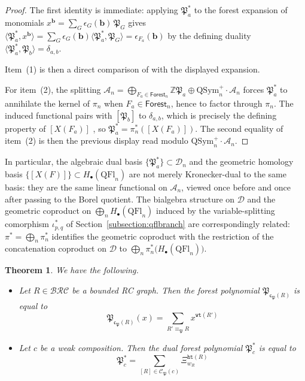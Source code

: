 \documentclass{amsart}
\newtheorem{theorem}{Theorem}[section]
\theoremstyle{definition}
\theoremstyle{remark}
\numberwithin{equation}{subsection}
\newcommand{\wof}[1]{w_{#1}}
\newcommand{\wtt}{\mathtt{wt}}
\newcommand{\hr}{\mathtt{ht}}
\newcommand{\BRC}{\mathcal{BRC}}
\newcommand{\dsch}{\ensuremath{\Xi}}
\newcommand{\coma}{\mathcal{A}}
\newcommand{\dcoma}{\mathcal{D}}
\newcommand{\forest}{\mathfrak{P}}
\newcommand{\fcode}{\mathfrak{c}_\forest}
\begin{document}
\begin{proof}
The first identity is immediate: applying $\forest_a^*$ to the forest expansion of monomials $x^{\mathbf{b}}=\sum_G \epsilon_G(\mathbf{b})\,\forest_G$ \cite[Proposition~10.15]{nadeau2024quasisymmetric} gives $\langle \forest_a^*, x^{\mathbf{b}}\rangle = \sum_G \epsilon_G(\mathbf{b})\langle \forest_a^*,\forest_G\rangle = \epsilon_{F_a}(\mathbf{b})$ by the defining duality $\langle \forest_a^*,\forest_b\rangle=\delta_{a,b}$.

Item~(1) is then a direct comparison of \cite[Proposition~10.14]{nadeau2024quasisymmetric} with the displayed expansion.

For item~(2), the splitting $\coma_n = \bigoplus_{F_a\in\mathsf{Forest}_n}\mathbb{Z}\forest_a \oplus \mathrm{QSym}_n^+\cdot\coma_n$ \cite[Theorem~9.7]{nadeau2024quasisymmetric} forces $\forest_a^*$ to annihilate the kernel of $\pi_n$ when $F_a\in\mathsf{Forest}_n$, hence to factor through $\pi_n$. The induced functional pairs with $[\forest_b]$ to $\delta_{a,b}$, which is precisely the defining property of $[X(F_a)]$ \cite[Theorem~12.12]{bergeron2025qsymflag}, so $\forest_a^*=\pi_n^*([X(F_a)])$. The second equality of item~(2) is then the previous display read modulo $\mathrm{QSym}_n^+\cdot\coma_n$.
\end{proof}

In particular, the algebraic dual basis $\{\forest_a^*\}\subset\dcoma_n$ and the geometric homology basis $\{[X(F)]\}\subset H_\bullet(\mathrm{QFl}_n)$ are not merely Kronecker-dual to the same basis: they are the same linear functional on $\coma_n$, viewed once before and once after passing to the Borel quotient. The bialgebra structure on $\dcoma$ and the geometric coproduct on $\bigoplus_n H_\bullet(\mathrm{QFl}_n)$ induced by the variable-splitting comorphism $\iota_{p,q}^*$ of Section~\ref{subsection:qflbranch} are correspondingly related: $\pi^* = \bigoplus_n \pi_n^*$ identifies the geometric coproduct with the restriction of the concatenation coproduct on $\dcoma$ to $\bigoplus_n \pi_n^*\!\bigl(H_\bullet(\mathrm{QFl}_n)\bigr)$.


\begin{theorem}\label{theorem:forestformula}
  We have the following.
  \begin{itemize}
\item[I] Let $R\in \BRC$ be a bounded RC graph. Then the forest polynomial $\forest_{\fcode(R)}$ is equal to
$$\forest_{\fcode(R)}(x)=\sum_{R'\equiv_{\forest} R} x^{\wtt(R')}$$

\item[II] Let $c$ be a weak composition. Then the dual forest polynomial $\forest^*_c$ is equal to
$$\forest^*_c = \sum_{[R]\in\mathcal{C}_\forest(c)} \dsch_{\wof{R}}^{\hr(R)}$$
  \end{itemize}
\end{theorem}
\end{document}
